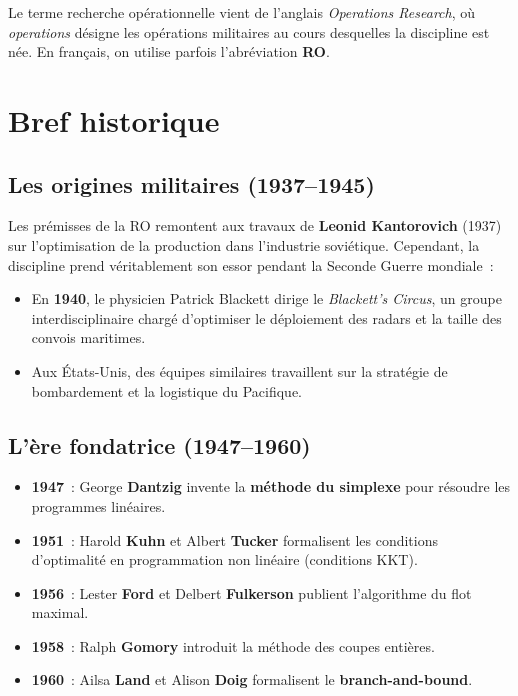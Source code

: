 \begin{remarque}
Le terme \og recherche op\'erationnelle \fg vient de l'anglais
\textit{Operations Research}, o\`u \textit{operations} d\'esigne les op\'erations
militaires au cours desquelles la discipline est n\'ee.  En fran\c{c}ais, on
utilise parfois l'abr\'eviation \textbf{RO}.
\end{remarque}

\section{Bref historique}

\subsection{Les origines militaires (1937--1945)}

Les pr\'emisses de la RO remontent aux travaux de \textbf{Leonid Kantorovich}
(1937) sur l'optimisation de la production dans l'industrie sovi\'etique.
Cependant, la discipline prend v\'eritablement son essor pendant la Seconde
Guerre mondiale~:

\begin{itemize}
  \item En \textbf{1940}, le physicien Patrick Blackett dirige le
        \textit{Blackett's Circus}, un groupe interdisciplinaire charg\'e
        d'optimiser le d\'eploiement des radars et la taille des convois
        maritimes.
  \item Aux \'Etats-Unis, des \'equipes similaires travaillent sur la strat\'egie
        de bombardement et la logistique du Pacifique.
\end{itemize}

\subsection{L'\`ere fondatrice (1947--1960)}

\begin{itemize}
  \item \textbf{1947}~: George \textbf{Dantzig} invente la \textbf{m\'ethode du
        simplexe} pour r\'esoudre les programmes lin\'eaires.
  \item \textbf{1951}~: Harold \textbf{Kuhn} et Albert \textbf{Tucker}
        formalisent les conditions d'optimalit\'e en programmation non lin\'eaire
        (conditions KKT).
  \item \textbf{1956}~: Lester \textbf{Ford} et Delbert \textbf{Fulkerson}
        publient l'algorithme du flot maximal.
  \item \textbf{1958}~: Ralph \textbf{Gomory} introduit la m\'ethode des
        coupes enti\`eres.
  \item \textbf{1960}~: Ailsa \textbf{Land} et Alison \textbf{Doig}
        formalisent le \textbf{branch-and-bound}.
\end{itemize}

